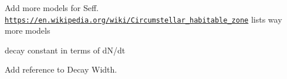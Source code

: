 
\begin{DoxyRefList}
\item[\label{todo__todo000001}%
\Hypertarget{todo__todo000001}%
File \hyperlink{_circumstellar_habitable_zone_8hpp}{Circumstellar\+Habitable\+Zone.hpp} ]Add more models for Seff. \href{https://en.wikipedia.org/wiki/Circumstellar_habitable_zone}{\tt https\+://en.\+wikipedia.\+org/wiki/\+Circumstellar\+\_\+habitable\+\_\+zone} lists way more models  
\item[\label{todo__todo000002}%
\Hypertarget{todo__todo000002}%
File \hyperlink{_decay_constant_8hpp}{Decay\+Constant.hpp} ]decay constant in terms of d\+N/dt  
\item[\label{todo__todo000003}%
\Hypertarget{todo__todo000003}%
File \hyperlink{_half_life_8hpp}{Half\+Life.hpp} ]Add reference to Decay Width. 
\end{DoxyRefList}